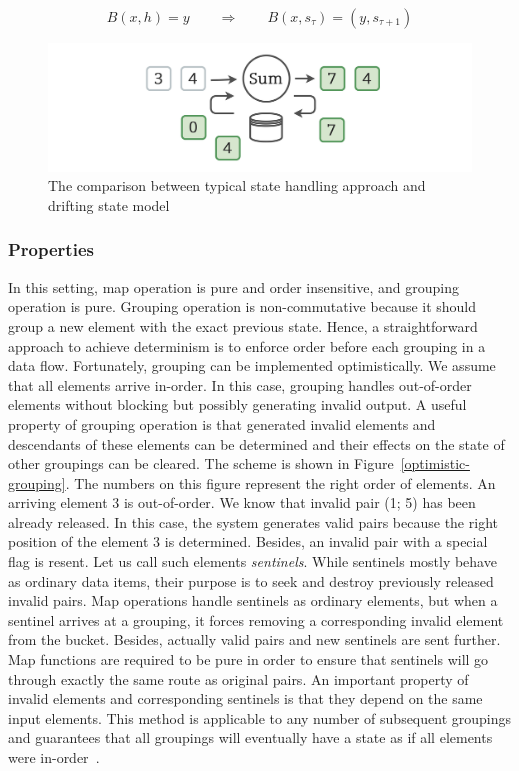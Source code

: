 \begin{equation}
  \label{flink-contract}
  B(x, h) = y \qquad\Longrightarrow\qquad B(x, s_{\tau}) = (y, s_{\tau+1}) 
\end{equation}

\begin{figure}[htbp]
  \centering
  \includegraphics[width=.49\textwidth]{pics/classical-drifting}
  \caption{The comparison between typical state handling approach and drifting state model}
  \label {classical-drifting}
\end{figure}

\subsubsection{Properties}

In this setting, map operation is pure and order insensitive, and grouping operation is pure. Grouping operation is non-commutative because it should group a new element with the exact previous state. Hence, a straightforward approach to achieve determinism is to enforce order before each grouping in a data flow. Fortunately, grouping can be implemented optimistically. We assume that all elements arrive in-order. In this case, grouping handles out-of-order elements without blocking but possibly generating invalid output. A useful property of grouping operation is that generated invalid elements and descendants of these elements can be determined and their effects on the state of other groupings can be cleared. The scheme is shown in Figure~\ref{optimistic-grouping}. The numbers on this figure represent the right order of elements. An arriving element 3 is out-of-order. We know that invalid pair (1; 5) has been already released. In this case, the system generates valid pairs because the right position of the element 3 is determined. Besides, an invalid pair with a special flag is resent. Let us call such elements {\em sentinels}. While sentinels mostly behave as ordinary data items, their purpose is to seek and destroy previously released invalid pairs. Map operations handle sentinels as ordinary elements, but when a sentinel arrives at a grouping, it forces removing a corresponding invalid element from the bucket. Besides, actually valid pairs and new sentinels are sent further. Map functions are required to be pure in order to ensure that sentinels will go through exactly the same route as original pairs. An important property of invalid elements and corresponding sentinels is that they depend on the same input elements. This method is applicable to any number of subsequent groupings and guarantees that all groupings will eventually have a state as if all elements were in-order~\cite{we2018adbis}.
 
